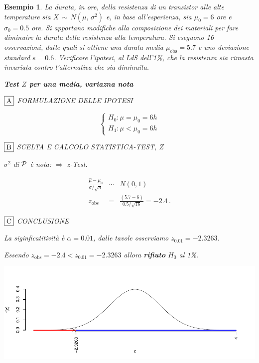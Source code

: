 \documentclass[
  11pt,
]{book}
\theoremstyle{mytheoremstyle}
\theoremstyle{mydefstyle}
\newtheorem{example}{{Esempio}}[section]
\begin{document}
\begin{example}

La durata, in ore, della resistenza di un transistor alle alte
temperature sia \(X \,\sim\, N(\mu,\, \sigma^{2})\) e, in base
all'esperienza, sia \(\mu_{0}=6\) ore e \(\sigma_{0}=0.5\) ore. Si apportano
modifiche alla composizione dei materiali per fare diminuire la durata
della resistenza alla temperatura. Si eseguono 16 osservazioni, dalle
quali si ottiene una durata media \(\mu_\text{obs}=5.7\) e uno deviazione
standard \(s=0.6\). Verificare l'ipotesi, al LdS dell'1\%, che la
resistenza sia rimasta invariata contro l'alternativa che sia diminuita.

\textbf{Test \(Z\) per una media, variazna nota}

\(\fbox{A}\) FORMULAZIONE DELLE IPOTESI

\[\begin{cases}
   H_0: \mu = \mu_0=6h \\
   H_1: \mu < \mu_0=6h 
   \end{cases}\]

\(\fbox{B}\) SCELTA E CALCOLO STATISTICA-TEST, \(Z\)

\(\sigma^{2}\) di \(\cal{P}\) è nota: \(\Rightarrow\) z-Test.

\begin{eqnarray*}
   \frac{\hat\mu - \mu_{0}} {\sigma/\sqrt{n}}&\sim&N(0,1)\\
   z_{\text{obs}}
   &=& \frac{ ( 5.7 -  6 )} { 0.5 /\sqrt{ 16 }}
   =   -2.4 \, .
   \end{eqnarray*}

\(\fbox{C}\) CONCLUSIONE

La siginficatitività è \(\alpha=0.01\), dalle tavole osserviamo \(z_{0.01}=-2.3263\).

Essendo \(z_\text{obs}=-2.4<z_{0.01}=-2.3263\) allora \textbf{rifiuto} \(H_0\) al 1\%.

\begin{center}\includegraphics{Appunti_di_Statistica_2025_files/figure-latex/15-test-mu-pi-3-1} \end{center}

\end{example}
\end{document}
